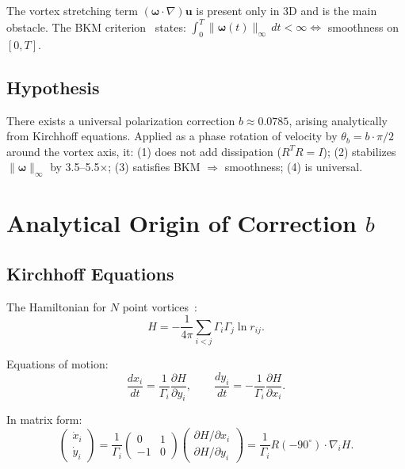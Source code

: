 \documentclass[11pt,a4paper]{article}
\begin{document}
The vortex stretching term $(\boldsymbol{\omega}\cdot\nabla)\mathbf{u}$ is present only in 3D and is the main obstacle. The BKM criterion~\cite{beale-kato-majda1984} states: $\int_0^T \|\boldsymbol{\omega}(t)\|_\infty\,dt < \infty \Leftrightarrow$ smoothness on $[0,T]$.

\subsection{Hypothesis}

\begin{tcolorbox}[colback=blue!3!white, colframe=accent, title=Central Hypothesis]
There exists a universal polarization correction $b \approx 0.0785$, arising analytically from Kirchhoff equations. Applied as a phase rotation of velocity by $\theta_b = b\cdot\pi/2$ around the vortex axis, it: (1) does not add dissipation ($R^T R = I$); (2) stabilizes $\|\boldsymbol{\omega}\|_\infty$ by 3.5--5.5$\times$; (3) satisfies BKM $\Rightarrow$ smoothness; (4) is universal.
\end{tcolorbox}

\section{Analytical Origin of Correction $b$}

\subsection{Kirchhoff Equations}

The Hamiltonian for $N$ point vortices~\cite{kirchhoff1876}:
\begin{equation}
H = -\frac{1}{4\pi}\sum_{i<j}\Gamma_i\Gamma_j\ln r_{ij}.
\end{equation}

Equations of motion:
\begin{equation}
\frac{dx_i}{dt} = \frac{1}{\Gamma_i}\frac{\partial H}{\partial y_i}, \qquad \frac{dy_i}{dt} = -\frac{1}{\Gamma_i}\frac{\partial H}{\partial x_i}.
\end{equation}

In matrix form:
\begin{equation}
\begin{pmatrix} \dot{x}_i \\ \dot{y}_i \end{pmatrix} = \frac{1}{\Gamma_i}\begin{pmatrix} 0 & 1 \\ -1 & 0 \end{pmatrix}\begin{pmatrix} \partial H/\partial x_i \\ \partial H/\partial y_i \end{pmatrix} = \frac{1}{\Gamma_i}R(-90^\circ)\cdot\nabla_i H.
\end{equation}
\end{document}
